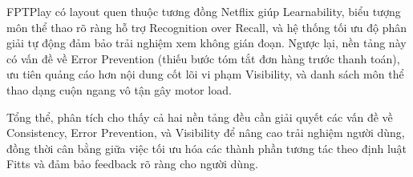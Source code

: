 FPTPlay có layout quen thuộc tương đồng Netflix giúp Learnability, biểu tượng môn thể thao rõ ràng hỗ trợ Recognition over Recall, và hệ thống tối ưu độ phân giải tự động đảm bảo trải nghiệm xem không gián đoạn. Ngược lại, nền tảng này có vấn đề về Error Prevention (thiếu bước tóm tắt đơn hàng trước thanh toán), ưu tiên quảng cáo hơn nội dung cốt lõi vi phạm Visibility, và danh sách môn thể thao dạng cuộn ngang vô tận gây motor load.

Tổng thể, phân tích cho thấy cả hai nền tảng đều cần giải quyết các vấn đề về Consistency, Error Prevention, và Visibility để nâng cao trải nghiệm người dùng, đồng thời cân bằng giữa việc tối ưu hóa các thành phần tương tác theo định luật Fitts và đảm bảo feedback rõ ràng cho người dùng.

\bigskip



